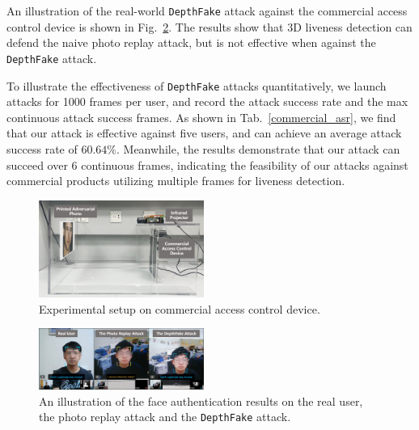 An illustration of the real-world \texttt{DepthFake} attack against the commercial access control device is shown in Fig.~\ref{compare}. The results show that 3D liveness detection can defend the naive photo replay attack, but is not effective when against the \texttt{DepthFake} attack. 

To illustrate the effectiveness of \texttt{DepthFake} attacks quantitatively, we launch attacks for 1000 frames per user, and record the attack success rate and the max continuous attack success frames.
As shown in Tab.~\ref{commercial_asr}, we find that our attack is effective against five users, and can achieve an average attack success rate of $60.64\%$. 
Meanwhile, the results demonstrate that our attack can succeed over 6 continuous frames, indicating the feasibility of our attacks against  commercial products utilizing multiple frames for liveness detection.

\begin{figure}[pt]
	\centerline{\includegraphics[width = 0.48\textwidth]{figures/commercial_setup.png}}
	\vspace{-0.1in}
	\caption{Experimental setup on commercial access control device.}
	\vspace{-0.15in}
	\label{setup_2}
\end{figure}
\begin{figure}[pt]
	\centerline{\includegraphics[width = 0.48\textwidth]{figures/commercial_compare.png}}
	\vspace{-0.1in}
	\caption{An illustration of the face authentication results on the real user, the photo replay attack and the \texttt{DepthFake} attack.}
	\vspace{-0.15in}
	\label{compare}
\end{figure}

